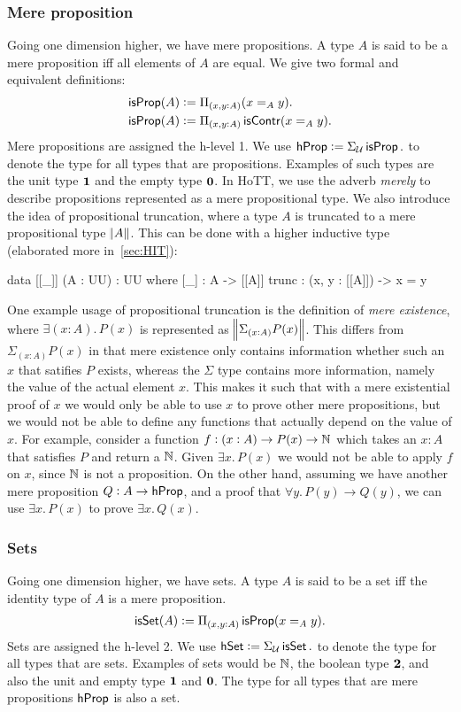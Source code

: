 \subsubsection{Mere proposition}
Going one dimension higher, we have mere propositions. A type $A$
is said to be a mere proposition iff all elements of $A$ are equal.
We give two formal and equivalent definitions:
\begin{align*}
    \operatorname{\mathsf{isProp}}(A) & := \Pi_{(x,y : A)}(x =_A y).\\
    \operatorname{\mathsf{isProp}}(A) & := \Pi_{(x,y : A)}\operatorname{\mathsf{isContr}}(x =_A y).
\end{align*}
Mere propositions are assigned the h-level 1.
We use $\mathsf{hProp} := \Sigma_{\mathcal{U}} \operatorname{\mathsf{isProp}}.$ to denote the type for
all types that are propositions.
Examples of such types
are the unit type ${\mathbf{1}}$ and the empty type ${\mathbf{0}}$. In HoTT,
we use the adverb \emph{merely} to describe propositions represented
as a mere propositional type. We also introduce the idea of
propositional truncation, where a type $A$ is truncated to 
a mere propositional type $\norm{A}$. This can be done with a higher
inductive type (elaborated more in~\cref{sec:HIT}):

\begin{code}
data [[_]] (A : UU) : UU where
    [_]  : A -> [[A]]
    trunc : (x, y : [[A]]) -> x = y
\end{code}
One example usage of propositional truncation is the definition of
\emph{mere existence}, where $\exists (x: A).\,P(x)$ is represented
as $\norm{\Sigma_{(x:A)}P(x)}$. This differs from $\Sigma_{(x:A)}P(x)$
in that mere existence only contains information whether such an $x$
that satifies $P$ exists, whereas the $\Sigma$ type contains more information,
namely the value of the actual element $x$. This makes it such that
with a mere existential proof of $x$ we would only be able to use $x$
to prove other mere propositions, but we would not be able to define
any functions that actually depend on the value of $x$. For example,
consider a function $f : (x : A) \to P(x) \to \mathbb{N}$ which takes an $x: A$
that satisfies $P$ and return a $\mathbb{N}$. Given $\exists x.\,P(x)$ we would
not be able to apply $f$ on $x$, since $\mathbb{N}$ is not a proposition. 
On the other hand, assuming we have another mere proposition
$Q : A \to \mathsf{hProp}$, and a proof that $\forall y.\,P(y) \to Q(y)$, 
we can use $\exists x.\,P(x)$ to prove $\exists x.\,Q(x)$.

\subsubsection{Sets}
Going one dimension higher, we have sets. A type $A$ is said to be a set
iff the identity type of $A$ is a mere proposition.
\begin{align*}
    \operatorname{\mathsf{isSet}}(A) := \Pi_{(x,y : A)}\operatorname{\mathsf{isProp}}(x =_A y).
\end{align*}
Sets are assigned the h-level 2.
We use $\mathsf{hSet} := \Sigma_{\mathcal{U}} \operatorname{\mathsf{isSet}}.$ to denote the type for
all types that are sets.
Examples of sets would be $\mathbb{N}$, the boolean type ${\mathbf{2}}$, and also
the unit and empty type ${\mathbf{1}}$ and ${\mathbf{0}}$. The type for all types
that are mere propositions $\mathsf{hProp}$ is also a set.

